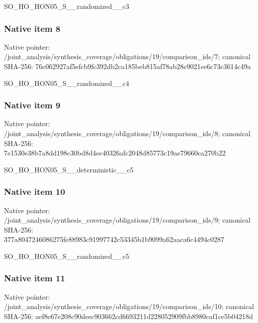 \documentclass[10pt,a4paper]{article}
\begin{document}
\begingroup\raggedright\sloppy SO\_\allowbreak{}HO\_\allowbreak{}HON05\_\allowbreak{}S\_\allowbreak{}\_\allowbreak{}randomized\_\allowbreak{}\_\allowbreak{}c3\par\endgroup

\subsubsection{Native item 8}
Native pointer: /joint\_\allowbreak{}analysis/synthesis\_\allowbreak{}coverage/obligations/19/comparison\_\allowbreak{}ids/7; canonical SHA-256: 76c062927af5efcb9fc392db2ca185beb815af78ab28e9021ee6c73c3614c49a

\begingroup\raggedright\sloppy SO\_\allowbreak{}HO\_\allowbreak{}HON05\_\allowbreak{}S\_\allowbreak{}\_\allowbreak{}randomized\_\allowbreak{}\_\allowbreak{}c4\par\endgroup

\subsubsection{Native item 9}
Native pointer: /joint\_\allowbreak{}analysis/synthesis\_\allowbreak{}coverage/obligations/19/comparison\_\allowbreak{}ids/8; canonical SHA-256: 7e1530e38b7a8dd198c30bd8d4ee40326afc2048d85773c19ae79660ca270b22

\begingroup\raggedright\sloppy SO\_\allowbreak{}HO\_\allowbreak{}HON05\_\allowbreak{}S\_\allowbreak{}\_\allowbreak{}deterministic\_\allowbreak{}\_\allowbreak{}c5\par\endgroup

\subsubsection{Native item 10}
Native pointer: /joint\_\allowbreak{}analysis/synthesis\_\allowbreak{}coverage/obligations/19/comparison\_\allowbreak{}ids/9; canonical SHA-256: 377a8047246086275fe88983c91997742c53345b1b9099a62aaca6c4494c0287

\begingroup\raggedright\sloppy SO\_\allowbreak{}HO\_\allowbreak{}HON05\_\allowbreak{}S\_\allowbreak{}\_\allowbreak{}randomized\_\allowbreak{}\_\allowbreak{}c5\par\endgroup

\subsubsection{Native item 11}
Native pointer: /joint\_\allowbreak{}analysis/synthesis\_\allowbreak{}coverage/obligations/19/comparison\_\allowbreak{}ids/10; canonical SHA-256: aef8e67e208c90deec903662cd6693211d228052909fbb8980caf1ce5b04218d
\end{document}
